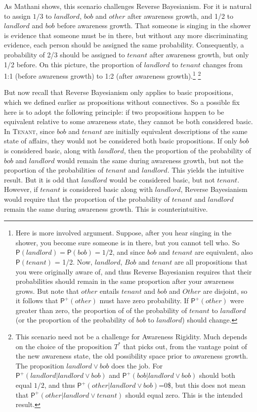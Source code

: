 \documentclass[
  11pt,
  dvipsnames,enabledeprecatedfontcommands]{scrartcl}
\newcommand{\pr}[1]{\ensuremath{\mathsf{P}(#1)}}
\newcommand{\ppr}[2]{\ensuremath{\mathsf{P}^{#1}(#2)}}
\begin{document}
As Mathani shows, this scenario challenges Reverse Bayesianism. For it
is natural to assign \(1/3\) to \(landlord\), \(bob\) and \(other\)
after awareness growth, and 1/2 to \(landlord\) and \(bob\) before
awareness growth. That someone is singing in the shower is evidence that
someone must be in there, but without any more discriminating evidence,
each person should be assigned the same probability. Consequently, a
probability of 2/3 should be assigned to \(tenant\) after awareness
growth, but only 1/2 before. On this picture, the proportion of
\(landlord\) to \(tenant\) changes from 1:1 (before awareness growth) to
1:2 (after awareness growth).\footnote{ Here is more involved argument.
  Suppose, after you hear singing in the shower, you become sure someone
  is in there, but you cannot tell who. So
  \(\pr{landlord} = \pr{bob} = 1/2\), and since \(bob\) and \(tenant\)
  are equivalent, also \(\pr{tenant}\) = 1/2. Now, \(landlord\), \(Bob\)
  and \(tenant\) are all propositions that you were originally aware of,
  and thus Reverse Bayesianisn requires that their probabilities should
  remain in the same proportion after your awareness grows. But note
  that \(other\) entails \(tenant\) and \(bob\) and \(Other\) are
  disjoint, so it follows that \(\ppr{+}{other}\) must have zero
  probability. If \(\ppr{+}{other}\) were greater than zero, the
  proportion of of the probability of \(tenant\) to \(landlord\) (or the
  proportion of the probability of \(bob\) to \(landlord\)) should
  change.} \footnote{This scenario need not be a challenge for Awareness
  Rigidity. Much depends on the choice of the proposition \(T^*\) that
  picks out, from the vantage point of the new awareness state, the old
  possibility space prior to awareness growth. The proposition
  \(landlord \vee bob\) does the job. For
  \(\ppr{+}{landlord \vert landlord \vee bob}\) and
  \(\ppr{+}{bob \vert landlord \vee bob}\) should both equal \(1/2\),
  and thus \ppr{+}{other \vert landlord \vee bob}=0\$, but this does not
  mean that \(\ppr{+}{other \vert landlord \vee tenant}\) should equal
  zero. This is the intended result.}

But now recall that Reverse Bayesianism only applies to basic
propositions, which we defined earlier as propositions without
connectives. So a possible fix here is to adopt the following principle:
if two propositions happen to be equivalent relative to some awareness
state, they cannot be both considered basic. In \textsc{Tenant}, since
\(bob\) and \(tenant\) are initially equivalent descriptions of the same
state of affairs, they would not be considered both basic propositions.
If only \(bob\) is considered basic, along with \(landlord\), then the
proportion of the probability of \(bob\) and \(landlord\) would remain
the same during awareness growth, but not the proportion of the
probabilities of \(tenant\) and \(landlord\). This yields the intuitive
result. But it is odd that \(landlord\) would be considered basic, but
not \(tenant\). However, if \(tenant\) is considered basic along with
\(landlord\), Reverse Bayesianism would require that the proportion of
the probability of \(tenant\) and \(landlord\) remain the same during
awareness growth. This is counterintuitive.
\end{document}
